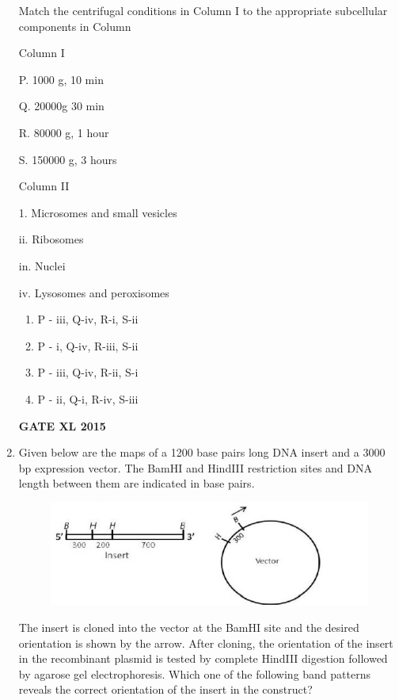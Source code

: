 \documentclass[journal,12pt,onecolumn]{IEEEtran}
\begin{document}
\begin{enumerate}
    
Match the centrifugal conditions in Column I to the appropriate subcellular components in Column
\begin{minipage}{0.5\textwidth}
	\begin{flushleft}
Column I

P. 1000 g, 10 min

Q. 20000g 30 min

R. 80000 g, 1 hour

S. 150000 g, 3 hours
	\end{flushleft}
\end{minipage}
\begin{minipage}{0.5\textwidth}
	\begin{flushleft}
Column II

1. Microsomes and small vesicles

ii. Ribosomes

in. Nuclei

iv. Lysosomes and peroxisomes
	\end{flushleft}
\end{minipage}
    \begin{enumerate}
            \item P - iii, Q-iv, R-i, S-ii
            \item P - i, Q-iv, R-iii, S-ii
            \item P - iii, Q-iv, R-ii, S-i
            \item P - ii, Q-i, R-iv, S-iii
    \end{enumerate}
\hfill{\textbf{GATE XL 2015}}
\item Given below are the maps of a 1200 base pairs  long DNA insert and a 3000 bp expression vector. The BamHI  and HindIII  restriction sites and DNA length between them are indicated in base pairs.

	\begin{figure}[h!]
		\centering
	\includegraphics[width=\columnwidth]{45}
		    \caption*{}
		\label{fig:Q45}
	\end{figure}

The insert is cloned into the vector at the BamHI site and the desired orientation is shown by the arrow. After cloning, the orientation of the insert in the recombinant plasmid is tested by complete HindIII digestion followed by agarose gel electrophoresis. Which one of the following band patterns reveals the correct orientation of the insert in the construct?
    

\end{enumerate}
\end{document}
